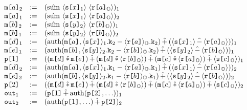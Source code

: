 $$
\begin{array}{lcl}
  \elab{\mesg{a}}{2} &:=&
  \elab{(\macotp\ \macgv{\elab{\secret{x}}{1}}\ \macgv{\elab{\flip{a}}{\Oracle}})}{1}\\
  \elab{\mesg{a}}{1} &:=&
  \elab{(\macotp\ \macgv{\elab{\secret{x}}{1}}\ \macgv{\elab{\flip{a}}{\Oracle}})}{2}\\
  \elab{\mesg{b}}{2} &:=&
  \elab{(\macotp\ \macgv{\elab{\secret{y}}{2}}\ \macgv{\elab{\flip{b}}{\Oracle}})}{1}\\
  \elab{\mesg{b}}{1} &:=&
  \elab{(\macotp\ \macgv{\elab{\secret{y}}{2}}\ \macgv{\elab{\flip{b}}{\Oracle}})}{2}\\
  \elab{\mesg{d}}{1} &:=&
  \elab{(\macauth(\mesg{a}, \mack{\macx{\secret{x}}{1}}{2} \fminus \mack{\macx{\flip{a}}{\Oracle}}{2}) \macplus (\macgv{\elab{\secret{x}}{1}}\macminus\macgv{\elab{\flip{a}}{\Oracle}}))}{1}\\
  \elab{\mesg{e}}{1}&:=&
  \elab{(\macauth(\mesg{b}, \mack{\macx{\secret{y}}{2}}{2} \fminus \mack{\macx{\flip{b}}{\Oracle}}{2}) \macplus (\macgv{\elab{\secret{y}}{2}}\macminus\macgv{\elab{\flip{b}}{\Oracle}}))}{1}\\
  \rvl{1} &:=&
  \elab{( (\mesg{d} \mactimes \mesg{e}) \macplus
          (\mesg{d} \mactimes \macgv{\elab{\flip{b}}{\Oracle}}) \macplus
          (\mesg{e} \mactimes \macgv{\elab{\flip{a}}{\Oracle}}) \macplus \macgv{\elab{\secret{c}}{\Oracle}}
    )}{1}\\
  \elab{\mesg{d}}{2} &:=&
  \elab{(\macauth(\mesg{a}, \mack{\macx{\secret{x}}{1}}{1} \fminus \mack{\macx{\flip{a}}{\Oracle}}{1}) \macplus (\macgv{\elab{\secret{x}}{1}}\macminus\macgv{\elab{\flip{a}}{\Oracle}}))}{2}\\
  \elab{\mesg{e}}{2}&:=&
  \elab{(\macauth(\mesg{b}, \mack{\macx{\secret{y}}{2}}{1} \fminus \mack{\macx{\flip{b}}{\Oracle}}{1}) \macplus (\macgv{\elab{\secret{y}}{2}}\macminus\macgv{\elab{\flip{b}}{\Oracle}}))}{2}\\
  \rvl{2} &:=&
  \elab{( (\mesg{d} \mactimes \mesg{e}) \macplus
          (\mesg{d} \mactimes \macgv{\elab{\flip{b}}{\Oracle}}) \macplus
          (\mesg{e} \mactimes \macgv{\elab{\flip{a}}{\Oracle}}) \macplus \macgv{\elab{\secret{c}}{\Oracle}}
    )}{2}\\
  \out{1} &:=& \elab{(\rvl{1} \macplus \macauth(\rvl{2},\ldots))}{1} \\
  \out{2} &:=& \elab{(\macauth(\rvl{1},\ldots) \macplus \rvl{2})}{2}
\end{array}
$$


